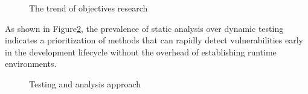 \begin{figure}[ht!]
    \centering
    \begin{adjustbox}{width=\linewidth,center}
        \end{adjustbox}

        \begin{adjustbox}{width=\linewidth,center}
         \end{adjustbox}
         
        \begin{adjustbox}{width=0.32\linewidth,center}
        
        \end{adjustbox}
    \caption{The trend of objectives research}
    \label{fig:trends}
\end{figure}

As shown in Figure\ref{fig:trends_app}, the prevalence of static analysis over dynamic testing indicates a prioritization of methods that can rapidly detect vulnerabilities early in the development lifecycle without the overhead of establishing runtime environments.

\begin{figure}[ht!]
    \centering
    \begin{adjustbox}{width=0.64\linewidth,center}
        \end{adjustbox}
    \caption{Testing and analysis approach}
    \label{fig:trends_app}
\end{figure}

